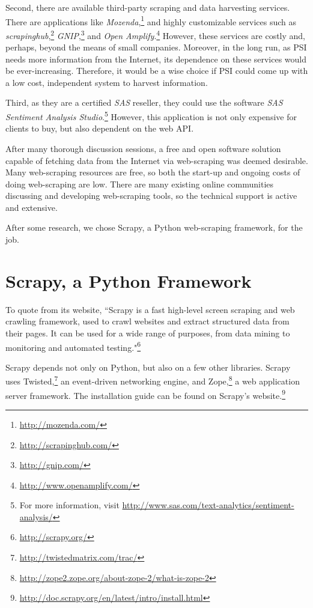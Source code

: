 \documentclass[12pt]{report}
\begin{document}
Second, there are available third-party scraping and data harvesting services. There are applications like \textit{Mozenda},\footnote{\url{http://mozenda.com/}} and highly customizable services such as \textit{scrapinghub},\footnote{\url{http://scrapinghub.com/}} \textit{GNIP},\footnote{\url{http://gnip.com/}} and \textit{Open Amplify}.\footnote{\url{http://www.openamplify.com/}} However, these services are costly and, perhaps, beyond the means of small companies. Moreover, in the long run, as PSI needs more information from the Internet, its dependence on these services would be ever-increasing. Therefore, it would be a wise choice if PSI could come up with a low cost, independent system to harvest information. 

Third, as they are a certified \textit{SAS} reseller, they could use the software \textit{SAS Sentiment Analysis Studio}.\footnote{For more information, visit \url{http://www.sas.com/text-analytics/sentiment-analysis/}} However, this application is not only expensive for clients to buy, but also dependent on the web API. 

After many thorough discussion sessions, a free and open software solution capable of fetching data from the Internet via web-scraping was deemed desirable. Many web-scraping resources are free, so both the start-up and ongoing costs of doing web-scraping are low. There are many existing online communities discussing and developing web-scraping tools, so the technical support is active and extensive.

After some research, we chose Scrapy, a Python web-scraping framework, for the job.

\section{Scrapy, a Python Framework}

To quote from its website, ``Scrapy is a fast high-level screen scraping and web crawling framework, used to crawl websites and extract structured data from their pages. It can be used for a wide range of purposes, from data mining to monitoring and automated testing."\footnote{\url{http://scrapy.org/}}

Scrapy depends not only on Python, but also on a few other libraries. Scrapy uses Twisted,\footnote{\url{http://twistedmatrix.com/trac/}} an event-driven networking engine, and Zope,\footnote{\url{http://zope2.zope.org/about-zope-2/what-is-zope-2}} a web application server framework. The installation guide can be found on Scrapy's website.\footnote{\url{http://doc.scrapy.org/en/latest/intro/install.html}}
\end{document}
